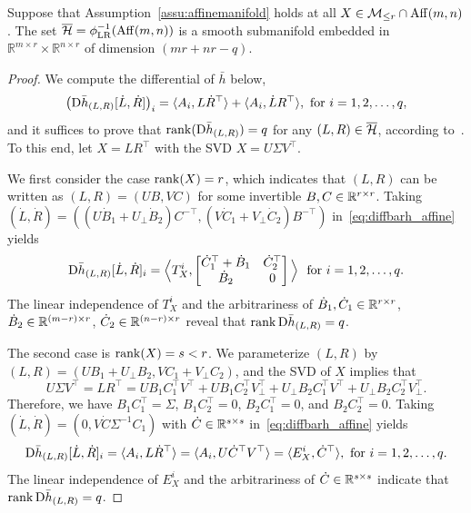 \begin{proposition}\label{pro:manifold_affine}
    Suppose that Assumption~\ref{assu:affinemanifold} holds at all $X\in\mathcal{M}_{\le r}\cap\mathrm{Aff}(m,n)$. The set $\overline{\mathcal{H}} = \phi_{\mathrm{LR}}^{-1}(\mathrm{Aff}(m,n))$ is a smooth submanifold embedded in $\mathbb{R}^{m\times r}\times\mathbb{R}^{n\times r}$ of dimension $(mr+nr-q)$.
\end{proposition}
\begin{proof}
We compute the differential of $\bar{h}$ below,
\begin{equation}\label{eq:diffbarh_affine}
    \kh{\diff \bar{h}_{(L,R)}[\dot{L},\dot{R}]}_i =\innerp{A_i,L\dot{R}^\top} + \innerp{A_i,\dot{L}R^\top},\ \text{for}\ i=1,2,\ldots,q,
\end{equation}    
and it suffices to prove that $\operatorname{rank}(\mathrm{D}\bar{h}_{(L,R)})=q$ for any $(L,R)\in\overline{\mathcal{H}}$, according to~\cite[Corollary 5.14]{lee2012manifolds}. To this end, let $X=LR^\top$ with the SVD $X=U\varSigma V^\top$.

We first consider the case $\operatorname{rank}(X)=r$, which indicates that $(L,R)$ can be written as $(L,R)=(UB,VC)$ for some invertible $B,C\in\mathbb{R}^{r\times r}$. Taking $(\dot{L},\dot{R})=((U\dot{B}_1+U_\bot \dot{B}_2)C^{-\top},(V\dot{C}_1+V_\bot \dot{C}_2)B^{-\top})$ in~\eqref{eq:diffbarh_affine} yields
\begin{equation*}
\mathrm{D} \bar{h}_{(L,R)}[\dot{L},\dot{R}]_i = \Big\langle T^i_X, \left[ \begin{matrix}
\dot{C}_{1}^{\top}+\dot{B}_1&		\dot{C}_{2}^{\top}\\
\dot{B}_2&		0\\
\end{matrix} \right] \Big\rangle\ \ \text{for}\ i=1,2,\ldots,q.
\end{equation*}
The linear independence of $T^i_X$ and the arbitrariness of $\dot{B}_1,\dot{C}_1\in\mathbb{R}^{r\times r}$, $\dot{B}_2\in\mathbb{R}^{(m-r)\times r}$, $\dot{C}_2\in\mathbb{R}^{(n-r)\times r}$ reveal that $\operatorname{rank} \mathrm{D}\bar{h}_{(L,R)} = q$. 


The second case is $\operatorname{rank}(X)=s<r$. We parameterize $(L,R)$ by $(L,R)=(UB_1+U_\bot B_2, VC_1+V_\bot C_2)$, and the SVD of $X$ implies that
\begin{equation*}
    U\varSigma V^\top = LR^\top = UB_1C^\top_1 V^\top + UB_1C_2^\top V_\bot^\top + U_\bot B_2C_1^\top V^\top + U_\bot B_2 C_2^\top V_\bot^\top.
\end{equation*}
Therefore, we have $B_1^{}C_1^\top=\varSigma$, $B_1^{}C^\top_2=0$, $B_2^{}C_1^\top=0$, and $B_2^{}C^\top_2=0$. Taking $(\dot{L},\dot{R})=(0,V\dot{C}\varSigma^{-1}C_1)$ with $\dot{C}\in\mathbb{R}^{s\times s}$ in~\eqref{eq:diffbarh_affine} yields
\begin{equation*}
    \diff \bar{h}_{(L,R)}[\dot{L},\dot{R}]_i =\innerp{A_i,L\dot{R}^\top}=\innerp{ A_i,U\dot{C}^\top V^\top}=\innerp{E^i_X,\dot{C}^\top},\ \text{for}\ i=1,2,\ldots,q.   
\end{equation*}
The linear independence of $E^i_X$ and the arbitrariness of $\dot{C}\in\mathbb{R}^{s\times s}$ indicate that $\operatorname{rank} \mathrm{D}\bar{h}_{(L,R)} = q$.
\end{proof}


